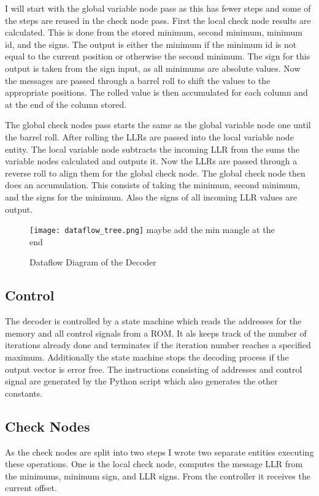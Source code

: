 I will start with the global variable node pass as this has fewer steps and some of the steps are reused in the check node pass. First the local check node results are calculated. This is done from the stored minimum, second minimum, minimum id, and the signs. The output is either the minimum if the minimum id is not equal to the current position or otherwise the second minimum. The sign for this output is taken from the sign input, as all minimums are absolute values. Now the messages are passed through a barrel roll to shift the values to the appropriate positions. The rolled value is then accumulated for each column and at the end of the column stored. 

The global check nodes pass starts the same as the global variable node one until the barrel roll. After rolling the LLRs are passed into the local variable node entity. The local variable node subtracts the incoming LLR from the sums the variable nodes calculated and outputs it. Now the LLRs are passed through a reverse roll to align them for the global check node. The global check node then does an accumulation. This consists of taking the minimum, second minimum, and the signs for the minimum. Also the signs of all incoming LLR values are output.

\begin{figure}
    \texttt{[image: dataflow\_tree.png]}
    maybe add the min mangle at the end
    \centering
    \caption{Dataflow Diagram of the Decoder}
    \label{datafl_tree}
\end{figure}

\subsection{Control}
The decoder is controlled by a state machine which reads the addresses for the memory and all control signals from a ROM. It als keeps track of the number of iterations already done and terminates if the iteration number reaches a specified maximum. Additionally the state machine stops the decoding process if the output vector is error free. The instructions consisting of addresses and control signal are generated by the Python script which also generates the other constants. 

\subsection{Check Nodes}
As the check nodes are split into two steps I wrote two separate entities executing these operations. One is the local check node, computes the message LLR from the minimums, minimum sign, and LLR signs. From the controller it receives the current offset. 

